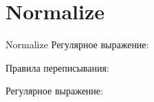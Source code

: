 \section{Normalize}
\begin{frame}{Normalize}
	Регулярное выражение:

	Правила переписывания:


	Регулярное выражение:

\end{frame}
